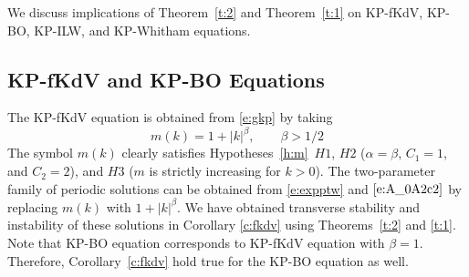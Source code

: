 \documentclass[12pt]{amsart}    %
\newtheorem{corollary}[theorem]{Corollary}
\numberwithin{equation}{section}
\begin{document}
We discuss implications of Theorem~\ref{t:2} and Theorem~\ref{t:1} on KP-fKdV, KP-BO, KP-ILW, and KP-Whitham equations.


\subsection{KP-fKdV and KP-BO Equations}\label{ss:1}
The KP-fKdV equation is obtained from \eqref{e:gkp} by taking
\[
m(k)= 1+|k|^\beta, \qquad \beta>1/2
\]  
The symbol $m(k)$ clearly satisfies Hypotheses~\ref{h:m}~$H1$, $H2$ ($\alpha=\beta$, $C_1=1$, and $C_2=2$), and $H3$ ($m$ is strictly increasing for $k>0$). The two-parameter family of periodic solutions can be obtained from \eqref{e:expptw} and $\eqref{e:A_0A2c2}$ by replacing $m(k)$ with $1+|k|^\beta$. We have obtained transverse stability and instability of these solutions in Corollary \ref{c:fkdv} using Theorems~\ref{t:2} and \ref{t:1}. Note that KP-BO equation corresponds to KP-fKdV equation with $\beta=1$. Therefore, Corollary~\ref{c:fkdv} hold true for the KP-BO equation as well.


\end{document}

